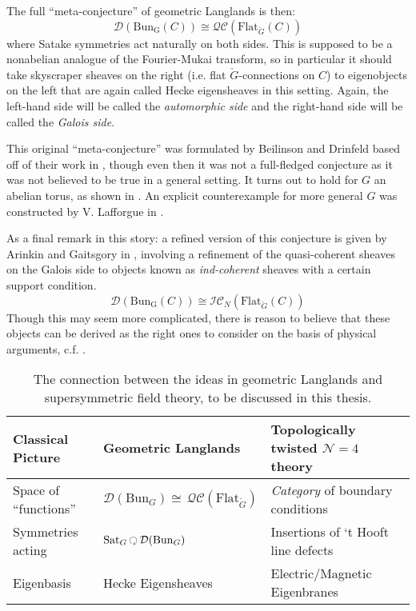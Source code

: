 The full ``meta-conjecture'' of geometric Langlands is then:
\begin{equation}
	\mathcal D (\mathrm{Bun_G}(C)) \cong \mathcal{QC} (\mathrm{Flat}_{\check G} (C))
\end{equation}
where Satake symmetries act naturally on both sides. This is supposed to be a nonabelian analogue of the Fourier-Mukai transform, so in particular it should take skyscraper sheaves on the right (i.e. flat $\check G$-connections on $C$) to eigenobjects on the left that are again called Hecke eigensheaves in this setting. Again, the left-hand side will be called the \emph{automorphic side} and the right-hand side will be called the \emph{Galois side}.

This original ``meta-conjecture'' was formulated by Beilinson and Drinfeld based off of their work in \cite{beilinson1991}, though even then it was not a full-fledged conjecture as it was not believed to be true in a general setting. It turns out to hold for $G$ an abelian torus, as shown in \cite{laumon1996}.
An explicit counterexample for more general $G$ was constructed by V. Lafforgue in \cite{lafforgue2009}.

As a final remark in this story: a refined version of this conjecture is given by Arinkin and Gaitsgory in \cite{arinkin2015}, involving a refinement of the quasi-coherent sheaves on the Galois side to objects known as \emph{ind-coherent} sheaves with a certain support condition. 
\begin{equation}
	\mathcal D (\mathrm{Bun_G}(C)) \cong \mathcal{IC}_{N} (\mathrm{Flat}_{\check G} (C))
\end{equation}
Though this may seem more complicated, there is reason to believe that these objects can be derived as the right ones to consider on the basis of physical arguments, c.f. \cite{elliott2017}. 

\begin{table}[h!]
	\centering
\begin{tabularx}{\textwidth}{|>{\hsize}Y|>{\hsize}Y|Y|}
	\hline
	Classical Picture & Geometric Langlands & Topologically twisted $\mathcal N=4$ theory\\
	\hline
	Space of ``functions'' & $\mathcal D (\mathrm{Bun}_G) \cong \, \mathcal{QC}(\mathrm{Flat}_{\check G})$ & \emph{Category} of boundary conditions \\
	Symmetries acting & $\mathrm{Sat}_G \lacts \mathcal D (\mathrm{Bun}_G)$ & Insertions of `t Hooft line defects\\
	Eigenbasis & Hecke Eigensheaves & Electric/Magnetic Eigenbranes\\
	\hline
	\end{tabularx}
\caption{The connection between the ideas in geometric Langlands and supersymmetric field theory, to be discussed in this thesis.}
\label{tab:langlands_and_physics}
\end{table}


